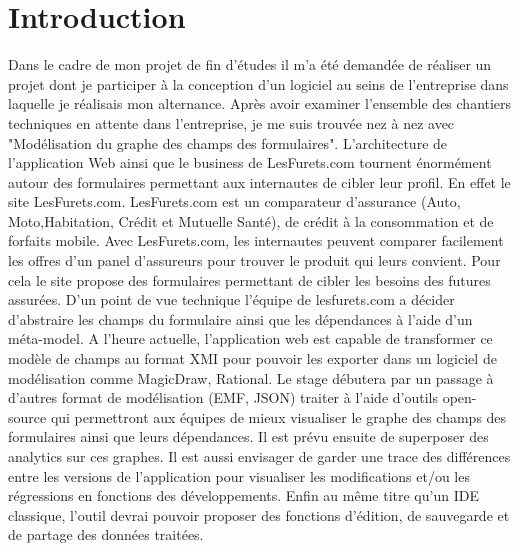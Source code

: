 \chapter{Introduction}
Dans le cadre de mon projet de fin d'études il m'a été demandée de réaliser un projet dont je participer à la conception d'un logiciel au seins de l'entreprise dans laquelle je réalisais mon alternance. Après avoir examiner l'ensemble des chantiers techniques en attente dans l'entreprise, je me suis trouvée nez à nez avec "Modélisation du graphe des champs des formulaires". L'architecture de l'application Web ainsi que le business de LesFurets.com tournent énormément autour des formulaires permettant aux internautes de cibler leur profil. En effet le site LesFurets.com. LesFurets.com est un comparateur d'assurance (Auto, Moto,Habitation, Crédit et Mutuelle Santé), de crédit à la consommation et de forfaits mobile. Avec LesFurets.com, les internautes peuvent comparer facilement les offres d’un panel d’assureurs pour trouver le produit qui leurs convient. Pour cela le site propose des formulaires permettant de cibler les besoins des futures assurées. D’un point de vue technique l’équipe de lesfurets.com a décider d’abstraire les champs du formulaire ainsi que les dépendances à l’aide d'un méta-model. A l’heure actuelle, l’application web est capable de transformer ce modèle de champs au format XMI pour pouvoir les exporter dans un logiciel de modélisation comme MagicDraw, Rational. Le stage débutera par un passage à d’autres format de modélisation (EMF, JSON) traiter à l'aide d'outils open-source qui permettront aux équipes de mieux visualiser le graphe des champs des formulaires ainsi que leurs dépendances. Il est prévu ensuite de superposer des analytics sur ces graphes. Il est aussi envisager de garder une trace des différences entre les versions de l’application pour visualiser les modifications et/ou les régressions en fonctions des développements. Enfin au même titre qu’un IDE classique, l’outil devrai pouvoir proposer des fonctions d’édition, de sauvegarde et de partage des données traitées.
